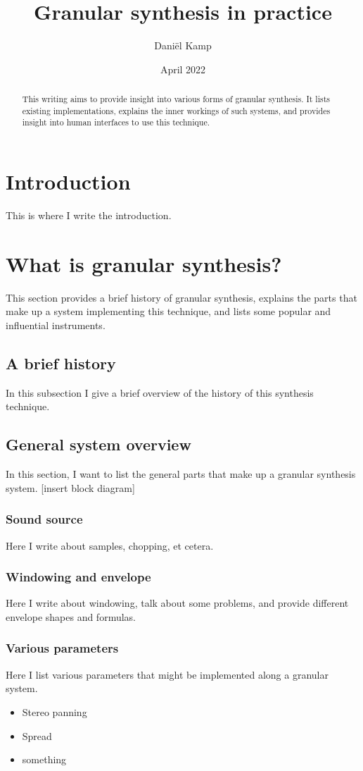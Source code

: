 \documentclass[12pt, IEEEtran]{article}
\title{Granular synthesis in practice}
\author{Daniël Kamp}
\date{April 2022}
\begin{document}
\maketitle

\begin{abstract}
This writing aims to provide insight into various forms of granular synthesis. It lists existing implementations, explains the inner workings of such systems, and provides insight into human interfaces to use this technique.
\end{abstract}

\section*{Introduction}
This is where I write the introduction.

\section{What is granular synthesis?}
This section provides a brief history of granular synthesis, explains the parts that make up a system implementing this technique, and lists some popular and influential instruments.

\subsection{A brief history}
In this subsection I give a brief overview of the history of this synthesis technique.

\subsection{General system overview}
In this section, I want to list the general parts that make up a granular synthesis system. [insert block diagram]
\subsubsection{Sound source}
Here I write about samples, chopping, et cetera.
\subsubsection{Windowing and envelope}
Here I write about windowing, talk about some problems, and provide different envelope shapes and formulas.
\subsubsection{Various parameters}
Here I list various parameters that might be implemented along a granular system.
\begin{itemize}
\item{Stereo panning}
\item{Spread}
\item{something}
\end{itemize}
\end{document}

